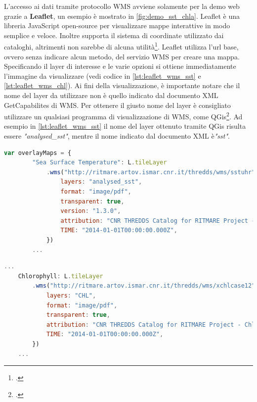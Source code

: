\documentclass[./main.tex]{subfiles}
\begin{document}
L'accesso ai dati tramite protocollo WMS avviene solamente per la demo web grazie a \textbf{Leaflet}, un esempio è mostrato in \autoref{fig:demo_sst_chla}. Leaflet è una libreria JavaScript open-source per visualizzare mappe interattive in modo semplice e veloce. Inoltre supporta il sistema di coordinate utilizzato dai cataloghi, altrimenti non sarebbe di alcuna utilità\footcite[\url{https://leafletjs.com/index.html}]{website-leaflet}. Leaflet utilizza l'url base, ovvero senza indicare alcun metodo, del servizio WMS per creare una mappa. Specificando il layer di interesse e le varie opzioni si ottiene immediatamente l'immagine da visualizzare (vedi codice in \autoref{lst:leaflet_wms_sst} e \autoref{lst:leaflet_wms_chl}). Ai fini della visualizzazione, è importante notare che il nome del layer da utilizzare non è quello indicato dal documento XML GetCapabilites di WMS. Per ottenere il giusto nome del layer è consigliato utilizzare un qualsiasi programma di visualizzazione di WMS, come QGis\footcite[\url{https://leafletjs.com/examples/wms/wms.html}]{website-leaflet}. Ad esempio in \autoref{lst:leaflet_wms_sst} il nome del layer ottenuto tramite QGis risulta essere \textit{"analysed\_sst"}, mentre il nome indicato dal documento XML è\textit{"sst"}.


\begin{lstlisting}[language=javascript, caption={Utilizzo di Leaflet per ricavare l'immagine della mappa per la variabile SST, a cui saranno aggiunte funzionalità per l'interazione}, label=lst:leaflet_wms_sst]
    var overlayMaps = {
        "Sea Surface Temperature": L.tileLayer
            .wms("http://ritmare.artov.ismar.cnr.it/thredds/wms/sstuhr", {
                layers: "analysed_sst",
                format: "image/pdf",
                transparent: true,
                version: "1.3.0",
                attribution: "CNR THREDDS Catalog for RITMARE Project - Sea Surface Temperature",
                TIME: "2014-01-01T00:00:00.000Z",
            })
        ...
\end{lstlisting}

\begin{lstlisting}[language=javascript, caption={Utilizzo di Leaflet per ricavare l'immagine della mappa per la variabile Chla, a cui saranno aggiunte funzionalità per l'interazione}, label=lst:leaflet_wms_chl]
    ...
    Chlorophyll: L.tileLayer
        .wms("http://ritmare.artov.ismar.cnr.it/thredds/wms/xchlcase12", {
            layers: "CHL",
            format: "image/pdf",
            transparent: true,
            attribution: "CNR THREDDS Catalog for RITMARE Project - Chlorophyll",
            TIME: "2014-01-01T00:00:00.000Z",
        })
    ...
\end{lstlisting}
\end{document}
